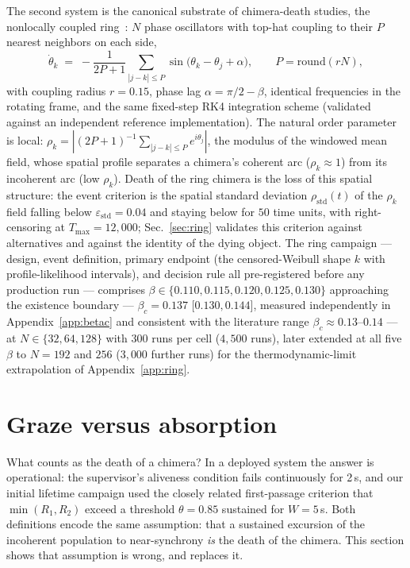 \documentclass[pdflatex,sn-mathphys,Numbered]{sn-jnl}
\begin{document}
The second system is the canonical substrate of chimera-death studies, the
nonlocally coupled ring~\cite{kb2002,wo2011}: $N$ phase oscillators with top-hat
coupling to their $P$ nearest neighbors on each side,
\begin{equation}
\dot\theta_k \;=\; -\frac{1}{2P+1} \sum_{|j-k|\le P}
\sin\!\big(\theta_k - \theta_j + \alpha\big),
\qquad P = \mathrm{round}(rN),
\label{eq:ring}
\end{equation}
with coupling radius $r = 0.15$, phase lag $\alpha = \pi/2 - \beta$, identical
frequencies in the rotating frame, and the same fixed-step RK4 integration scheme
(validated against an independent reference implementation). The natural order
parameter is local: $\rho_k = |(2P+1)^{-1} \sum_{|j-k| \le P} e^{i\theta_j}|$, the
modulus of the windowed mean field, whose spatial profile separates a chimera's
coherent arc ($\rho_k \approx 1$) from its incoherent arc (low $\rho_k$). Death of
the ring chimera is the loss of this spatial structure: the event criterion is the
spatial standard deviation $\rho_{\mathrm{std}}(t)$ of the $\rho_k$ field falling
below $\varepsilon_{\mathrm{std}} = 0.04$ and staying below for $50$ time units,
with right-censoring at $T_{\max} = 12{,}000$; Sec.~\ref{sec:ring} validates this
criterion against alternatives and against the identity of the dying object. The
ring campaign --- design, event definition, primary endpoint (the censored-Weibull
shape $k$ with profile-likelihood intervals), and decision rule all pre-registered
before any production run --- comprises
$\beta \in \{0.110, 0.115, 0.120, 0.125, 0.130\}$ approaching the existence
boundary --- $\beta_c = 0.137$ [$0.130, 0.144$], measured independently in
Appendix~\ref{app:betac} and consistent with the literature range
$\beta_c \approx 0.13$--$0.14$ --- at $N \in \{32, 64, 128\}$ with $300$ runs
per cell ($4{,}500$ runs), later extended at all five $\beta$ to $N = 192$ and
$256$ ($3{,}000$ further runs) for the thermodynamic-limit extrapolation of
Appendix~\ref{app:ring}.

\section{Graze versus absorption}\label{sec:graze}

What counts as the death of a chimera? In a deployed system the answer is
operational: the supervisor's aliveness condition fails continuously for 2\,s, and
our initial lifetime campaign used the closely related first-passage criterion that
$\min(R_1, R_2)$ exceed a threshold $\theta = 0.85$ sustained for $W = 5$\,s. Both
definitions encode the same assumption: that a sustained excursion of the incoherent
population to near-synchrony \emph{is} the death of the chimera. This section shows
that assumption is wrong, and replaces it.
\end{document}

